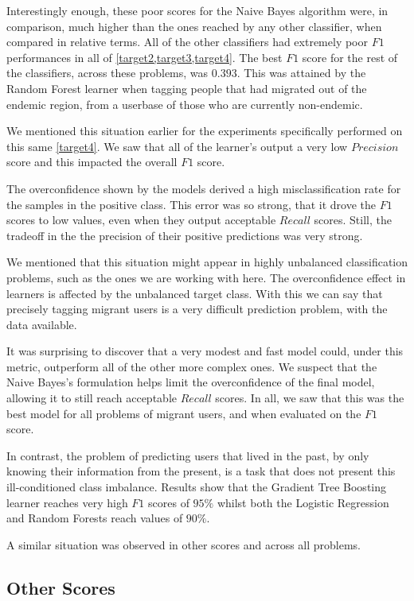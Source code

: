 Interestingly enough, these poor scores for the Naive Bayes algorithm were, in comparison, much higher than the ones reached by any other classifier, when compared in relative terms.
All of the other classifiers had extremely poor $F1$ performances in all of \cref{target2,target3,target4}.
The best $F1$ score for the rest of the classifiers, across these problems, was $0.393$.
This was attained by the Random Forest learner when tagging people that had migrated out of the endemic region, from a userbase of those who are currently non-endemic.

We mentioned this situation earlier for the experiments specifically performed on this same \cref{target4}.
We saw that all of the learner's output a very low $Precision$ score and this impacted the overall $F1$ score.

The overconfidence shown by the models derived a high misclassification rate for the samples in the positive class.
This error was so strong, that it drove the $F1$ scores to low values, even when they output acceptable $Recall$ scores.
Still, the tradeoff in the the precision of their positive predictions was very strong.

We mentioned that this situation might appear in highly unbalanced classification problems, such as the ones we are working with here.
The overconfidence effect in learners is affected by the unbalanced target class.
With this we can say that precisely tagging migrant users is a very difficult prediction problem, with the data available.

It was surprising to discover that a very modest and fast model could, under this metric, outperform all of the other more complex ones.
We suspect that the Naive Bayes's formulation helps limit the overconfidence of the final model, allowing it to still reach acceptable $Recall$ scores.
In all, we saw that this was the best model for all problems of migrant users, and when evaluated on the $F1$ score.

In contrast, the problem of predicting users that lived in the past, by only knowing their information from the present, is a task that does not present this ill-conditioned class imbalance.
Results show that the Gradient Tree Boosting learner reaches very high $F1$ scores of $95\%$ whilst both the Logistic Regression and Random Forests reach values of $90\%$.

A similar situation was observed in other scores and across all problems.


\subsection{Other Scores}\label{subsec:master_table_other_scores}


